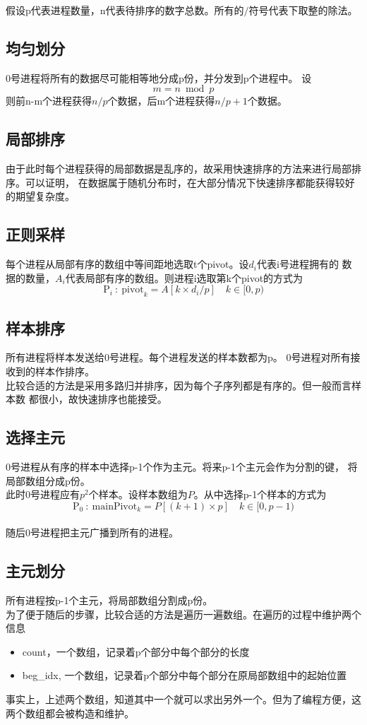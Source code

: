 \documentclass[a4paper]{article}
\begin{document}
假设p代表进程数量，n代表待排序的数字总数。所有的$/$符号代表下取整的除法。
\subsection{均匀划分}\label{subsec:st1}
0号进程将所有的数据尽可能相等地分成p份，并分发到p个进程中。
设$$m = n \bmod p$$
则前n-m个进程获得$n/p$个数据，后m个进程获得$n/p + 1$个数据。
\subsection{局部排序}
由于此时每个进程获得的局部数据是乱序的，故采用快速排序的方法来进行局部排序。可以证明，
在数据属于随机分布时，在大部分情况下快速排序都能获得较好的期望复杂度。
\subsection{正则采样}
每个进程从局部有序的数组中等间距地选取t个pivot。设$d_i$代表i号进程拥有的
数据的数量，$A_i$代表局部有序的数组。则进程i选取第k个pivot的方式为
$$\text{P}_i \ : \ \text{pivot}_k = A[k \times d_i / p] \quad k \in [0, p)$$
\subsection{样本排序}
所有进程将样本发送给0号进程。每个进程发送的样本数都为p。
0号进程对所有接收到的样本作排序。\\

比较合适的方法是采用多路归并排序，因为每个子序列都是有序的。但一般而言样本数
都很小，故快速排序也能接受。
\subsection{选择主元}
0号进程从有序的样本中选择p-1个作为主元。将来p-1个主元会作为分割的键，
将局部数组分成p份。\\

此时0号进程应有$p^2$个样本。设样本数组为$P$。从中选择p-1个样本的方式为
$$\text{P}_0\ :\ \text{mainPivot}_k = P[(k + 1) \times p] \quad k \in [0, p - 1)$$
\\
随后0号进程把主元广播到所有的进程。
\subsection{主元划分}\label{subsec:mpdiv}
所有进程按p-1个主元，将局部数组分割成p份。\\

为了便于随后的步骤，比较合适的方法是遍历一遍数组。在遍历的过程中维护两个信息
\begin{itemize}
    \item count，一个数组，记录着p个部分中每个部分的长度
    \item beg\_idx, 一个数组，记录着p个部分中每个部分在原局部数组中的起始位置
\end{itemize}
事实上，上述两个数组，知道其中一个就可以求出另外一个。但为了编程方便，这两个数组都会被构造和维护。
\end{document}
